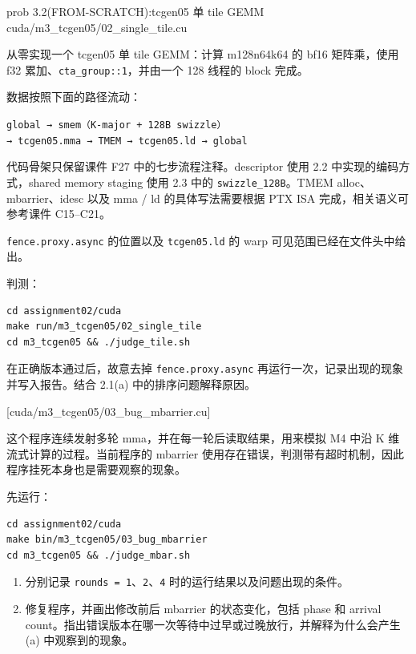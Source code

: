 \documentclass[11pt,a4paper,fontset=fandol]{ctexart}
\begin{document}
\begin{capstone}{prob 3.2(FROM-SCRATCH):tcgen05 单 tile GEMM \hfill {\footnotesize\ttfamily cuda/m3\_tcgen05/02\_single\_tile.cu}}

从零实现一个 tcgen05 单 tile GEMM：计算 m128n64k64 的 bf16 矩阵乘，使用
f32 累加、\texttt{cta\_group::1}，并由一个 128 线程的 block 完成。

数据按照下面的路径流动：

\texttt{global\ →\ smem（K-major\ +\ 128B\ swizzle）→\ tcgen05.mma\ →\ TMEM\ →\ tcgen05.ld\ →\ global}

代码骨架只保留课件 F27 中的七步流程注释。descriptor 使用 2.2
中实现的编码方式，shared memory staging 使用 2.3 中的
\texttt{swizzle\_128B}。TMEM alloc、mbarrier、idesc 以及 mma / ld
的具体写法需要根据 PTX ISA 完成，相关语义可参考课件 C15--C21。

\texttt{fence.proxy.async} 的位置以及 \texttt{tcgen05.ld} 的 warp
可见范围已经在文件头中给出。

判测：

\begin{verbatim}
cd assignment02/cuda
make run/m3_tcgen05/02_single_tile
cd m3_tcgen05 && ./judge_tile.sh
\end{verbatim}

在正确版本通过后，故意去掉 \texttt{fence.proxy.async}
再运行一次，记录出现的现象并写入报告。结合 2.1(a) 中的排序问题解释原因。

\end{capstone}

[cuda/m3\_tcgen05/03\_bug\_mbarrier.cu]

这个程序连续发射多轮 mma，并在每一轮后读取结果，用来模拟 M4 中沿 K
维流式计算的过程。当前程序的 mbarrier
使用存在错误，判测带有超时机制，因此程序挂死本身也是需要观察的现象。

先运行：

\begin{verbatim}
cd assignment02/cuda
make bin/m3_tcgen05/03_bug_mbarrier
cd m3_tcgen05 && ./judge_mbar.sh
\end{verbatim}

\begin{enumerate}
\def\labelenumi{(\alph{enumi})}
\item
  分别记录 \texttt{rounds\ =\ 1}、\texttt{2}、\texttt{4}
  时的运行结果以及问题出现的条件。
\item
  修复程序，并画出修改前后 mbarrier 的状态变化，包括 phase 和 arrival
  count。指出错误版本在哪一次等待中过早或过晚放行，并解释为什么会产生
  (a) 中观察到的现象。
\end{enumerate}
\end{document}
